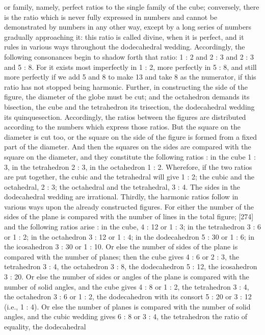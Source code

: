\documentclass{article}
\begin{document}
or family, namely, perfect ratios to the single family of the cube;
conversely, there is the ratio which is never fully expressed in numbers
and cannot be demonstrated by numbers in any other way, except by a
long series of numbers gradually approaching it: this ratio is
called divine, when it is perfect, and it rules in various ways throughout
the dodecahedral wedding. Accordingly, the following consonances begin
to shadow forth that ratio: 1 : 2 and 2 : 3 and 2 : 3 and 5 : 8. For it exists
most imperfectly in 1 : 2, more perfectly in 5 : 8, and still more perfectly
if we add 5 and 8 to make 13 and take 8 as the numerator, if this ratio
has not stopped being harmonic.
Further, in constructing the side of the figure, the diameter of the globe
must be cut; and the octahedron demands its bisection, the cube and the
tetrahedron its trisection, the dodecahedral wedding its quinquesection.
Accordingly, the ratios between the figures are distributed according to
the numbers which express those ratios. But the square on the diameter
is cut too, or the square on the side of the figure is formed from a fixed
part of the diameter. And then the squares on the sides are compared
with the square on the diameter, and they constitute the following ratios
: in the cube 1 : 3, in the tetrahedron 2 : 3, in the octahedron 1 : 2.
Wherefore, if the two ratios are put together, the cubic and the
tetrahedral will give 1 : 2; the cubic and the octahedral, 2 : 3; the
octahedral and the tetrahedral, 3 : 4. The sides in the dodecahedral
wedding are irrational.
Thirdly, the harmonic ratios follow in various ways upon the already
constructed figures. For either the number of the sides of the plane is
compared with the number of lines in the total figure; [274] and the
following ratios arise : in the cube, 4 : 12 or 1 : 3; in the tetrahedron 3 : 6
or 1 : 2; in the octahedron 3 : 12 or 1 : 4; in the dodecahedron 5 : 30 or 1 :
6; in the icosahedron 3 : 30 or 1 : 10. Or else the number of sides of the
plane is compared with the number of planes; then the cube gives 4 : 6 or
2 : 3, the tetrahedron 3 : 4, the octahedron 3 : 8, the dodecahedron 5 : 12,
the icosahedron 3 : 20. Or else the number of sides or angles of the plane
is compared with the number of solid angles, and the cube gives 4 : 8 or 1
: 2, the tetrahedron 3 : 4, the octahedron 3 : 6 or 1 : 2, the dodecahedron
with its consort 5 : 20 or 3 : 12 (i.e., 1 : 4). Or else the number of planes is
compared with the number of solid angles, and the cubic wedding gives 6
: 8 or 3 : 4, the tetrahedron the ratio of equality, the dodecahedral
\end{document}
